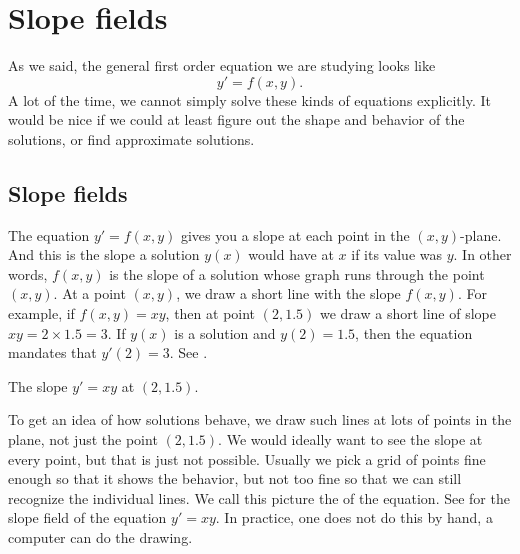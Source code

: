 
\sectionnewpage
\section{Slope fields}
\label{slopefields:section}


%

As we said, the general first order equation we are studying looks like
\begin{equation*}
y' = f(x,y).
\end{equation*}
A lot of the time, we cannot simply solve these kinds of equations explicitly.
It would be nice if we could at least figure out the shape and behavior of
the solutions, or find approximate solutions.

\subsection{Slope fields}

The equation $y' = f(x,y)$
gives you a slope at each point 
in the
$(x,y)$-plane.  And this is the slope a solution $y(x)$ would have 
at $x$ if its value was $y$.  In other words, $f(x,y)$ is the slope
of a solution whose graph runs through the
point $(x,y)$.  At a point $(x,y)$, we draw a short line
with the slope $f(x,y)$.
For example, if $f(x,y) = xy$, then at point $(2,1.5)$ we draw a
short line of slope $xy = 2 \times 1.5 = 3$.  If $y(x)$ is a solution
and $y(2) = 1.5$, then the equation mandates that $y'(2) = 3$.
See .

\begin{myfig}
\capstart
{}
\caption{The slope $y'=xy$ at $(2,1.5)$.\label{1.3:fig0}}
\end{myfig}

To get an idea of how solutions behave, we draw such lines at lots
of points in the plane, not just the point $(2,1.5)$.  We would
ideally want to see the slope at every point, but that is
just not possible.  Usually we pick a
grid of points fine enough so that it shows the behavior, but not too
fine so that we can still recognize the individual lines.
We call this picture the \emph{} of the equation.
See  for the slope field of the equation $y' = xy$.
In practice, one does not do this by hand, a computer can do the
drawing.

